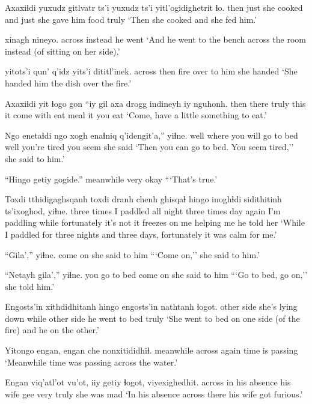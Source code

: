 \documentclass[12pt]{article}
\begin{document}
\gll Axaxiɬdi yuxudz gitlvatr ts'i yuxudz ts'i yitl'ogidighetrit ɬo. 
then just {she cooked} and just {she gave him food} truly
\glt `Then she cooked and she fed him.' 
\glend

 xinagh nineyo. 
across instead {he went}
\glt `And he went to the bench across the room instead (of sitting on her side).' 
\glend

 yitots'i qun' q'idz yits'i {dititl'inek}. 
across then fire over {to him} {she handed}
\glt `She handed him the dish over the fire.' 
\glend

\gll Axaxiɬdi yit ɬogo gon ``iy gil axa {drogg indineyh} iy nguhonh.
then there truly this it {come} with {eat meal} it {you eat}
\glt `Come, have a little something to eat.' 
\glend

\gll Ngo enetaɬdi ngo {xogh enaɬniq} q'idengit'a,'' yiɬne. 
well {where you will go to bed} well {you're tired} {you seem} {she said}
\glt `Then you can go to bed. You seem tired,'' she said to him.' 
\glend

\gll ``Hingo getiy gogide.'' 
meanwhile very okay
\glt ```That's true.' 
\glend

\gll Toxdi tthidigaghsqanh toxdi dranh chenh ghisqaɬ hingo inoghɬdi sidithitinh ts'ixoghod, yiɬne.
{three times} {I paddled all night} {three times} day again {I'm paddling} while {fortunately it's not} {it freezes on me} {helping me} {he told her}
\glt `While I paddled for three nights and three days, fortunately it was calm for me.' 
\glend

\gll ``Gila','' yiɬne. 
{come on} {she said to him }
\glt ```Come on,'' she said to him.'
\glend

\gll ``Netayh gila','' yiɬne. 
{you go to bed} {come on} {she said to him}
\glt ```Go to bed, go on,'' she told him.' 
\glend

\gll Engosts'in xithdidhitanh hingo engosts'in nathtanh ɬogot. 
{other side} {she's lying down} while {other side} {he went to bed} truly 
\glt `She went to bed on one side (of the fire) and he on the other.' 
\glend

\gll Yitongo engan, engan che nonxitididhiɬ.
meanwhile across {} again {time is passing} 
\glt `Meanwhile time was passing across the water.'
\glend

\gll Engan viq'atl'ot vu'ot, iiy getiy ɬogot, viyexighedhit. 
across {in his absence} {his wife} gee very truly {she was mad}
\glt `In his absence across there his wife got furious.' 
\glend
\end{document}
